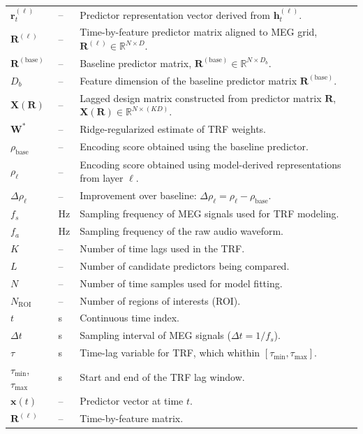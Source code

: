 \documentclass[12pt]{article}
\begin{document}
\begin{longtable}{l l p{11.2cm}}
$\boldsymbol{r}^{(\ell)}_t$ & -- & Predictor representation vector derived from $\boldsymbol{h}^{(\ell)}_t$.\\
$\mathbf{R}^{(\ell)}$ & -- & Time-by-feature predictor matrix aligned to MEG grid, $\mathbf{R}^{(\ell)}\in\mathbb{R}^{N\times D}$.\\
$\mathbf{R}^{(\mathrm{base})}$ & -- & Baseline predictor matrix, $\mathbf{R}^{(\mathrm{base})}\in\mathbb{R}^{N\times D_b}$.\\
$D_b$ & -- & Feature dimension of the baseline predictor matrix $\mathbf{R}^{(\mathrm{base})}$.\\
$\mathbf{X}(\mathbf{R})$ & -- & Lagged design matrix constructed from predictor matrix $\mathbf{R}$, $\mathbf{X}(\mathbf{R})\in\mathbb{R}^{N\times (KD)}$.\\
$\mathbf{W}^\ast$ & -- & Ridge-regularized estimate of TRF weights.\\
$\rho_{\mathrm{base}}$ & -- & Encoding score obtained using the baseline predictor.\\
$\rho_{\ell}$ & -- & Encoding score obtained using model-derived representations from layer $\ell$.\\
$\Delta\rho_{\ell}$ & -- & Improvement over baseline: $\Delta\rho_{\ell} = \rho_{\ell} - \rho_{\mathrm{base}}$.\\
$f_s$ & \si{\hertz} & Sampling frequency of MEG signals used for TRF modeling.\\
$f_a$ & \si{\hertz} & Sampling frequency of the raw audio waveform.\\
$K$ & -- & Number of time lags used in the TRF.\\
$L$ & -- & Number of candidate predictors being compared.\\
$N$ & -- & Number of time samples used for model fitting.\\
$N_{\mathrm{ROI}}$ & -- & Number of regions of interests (ROI).\\
$t$ & \si{\second} & Continuous time index.\\
$\Delta t$ & \si{\second} & Sampling interval of MEG signals ($\Delta t = 1/f_s$).\\
$\tau$ & \si{\second} & Time-lag variable for TRF, which whithin $[\tau_{\min}, \tau_{\max}]$.\\
$\tau_{\min}$, $\tau_{\max}$ & \si{\second} & Start and end of the TRF lag window.\\
$\boldsymbol{x}(t)$ & -- & Predictor vector at time $t$.\\
$\mathbf{R}^{(\ell)}$ & -- & Time-by-feature matrix. \\

\end{longtable}
\end{document}
